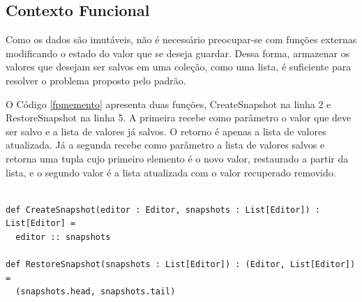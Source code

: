 \subsection*{Contexto Funcional}

Como os dados são imutáveis, não é necessário 
preocupar-se com funções externas modificando o 
estado do valor que se deseja guardar. Dessa forma, 
armazenar os valores que desejam ser salvos em 
uma coleção, como uma lista, é suficiente para 
resolver o problema proposto pelo padrão.

O Código \ref{fpmemento} apresenta duas funções, 
CreateSnapshot na linha 2 e RestoreSnapshot na linha 
5. A primeira recebe como parâmetro o valor que 
deve ser salvo e a lista de valores já salvos. 
O retorno é apenas a lista de valores atualizada. 
Já a segunda recebe como parâmetro a lista de 
valores salvos e retorna uma tupla cujo 
primeiro elemento é o novo valor, restaurado 
a partir da lista, e o segundo valor é a 
lista atualizada com o valor recuperado 
removido.

\begin{lstlisting}[caption={Memento Funcional.},label=fpmemento]

def CreateSnapshot(editor : Editor, snapshots : List[Editor]) : List[Editor] =
  editor :: snapshots

def RestoreSnapshot(snapshots : List[Editor]) : (Editor, List[Editor]) =
  (snapshots.head, snapshots.tail)

\end{lstlisting}